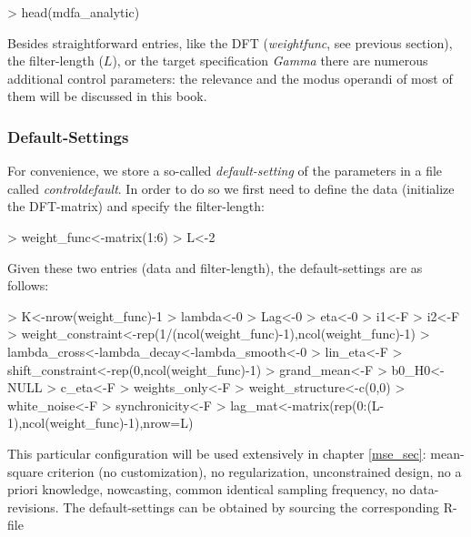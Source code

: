 \documentclass[a4paper]{book}
\begin{document}
\begin{Schunk}
\begin{Sinput}
> head(mdfa_analytic)
\end{Sinput}
\begin{Soutput}
1 function (K, L, lambda, weight_func, Lag, Gamma, eta, cutoff,              
2     i1, i2, weight_constraint, lambda_cross, lambda_decay, lambda_smooth,  
3     lin_eta, shift_constraint, grand_mean, b0_H0, c_eta, weights_only = F, 
4     weight_structure, white_noise, synchronicity, lag_mat)                 
5 {                                                                          
6     weight_target <- weight_func[, 1]                                      
\end{Soutput}
\end{Schunk}
Besides straightforward entries, like the DFT (\emph{weight\textunderscore func}, see previous section), the filter-length ($L$), or the target specification \emph{Gamma} there are numerous additional control parameters: the relevance and the modus operandi of most of them will be discussed in this book. 


\subsubsection{Default-Settings}

For convenience, we store a so-called \emph{default-setting} of the parameters in a file called \emph{control\textunderscore default}. In order to do so we first need to define the data (initialize the DFT-matrix) and specify the filter-length:
\begin{Schunk}
\begin{Sinput}
> weight_func<-matrix(1:6)
> L<-2
\end{Sinput}
\end{Schunk}
Given these two entries (data and filter-length), the default-settings are as follows:
\begin{Schunk}
\begin{Sinput}
> K<-nrow(weight_func)-1
> lambda<-0
> Lag<-0
> eta<-0
> i1<-F
> i2<-F
> weight_constraint<-rep(1/(ncol(weight_func)-1),ncol(weight_func)-1)
> lambda_cross<-lambda_decay<-lambda_smooth<-0
> lin_eta<-F
> shift_constraint<-rep(0,ncol(weight_func)-1)
> grand_mean<-F
> b0_H0<-NULL
> c_eta<-F
> weights_only<-F
> weight_structure<-c(0,0)
> white_noise<-F
> synchronicity<-F
> lag_mat<-matrix(rep(0:(L-1),ncol(weight_func)-1),nrow=L)
\end{Sinput}
\end{Schunk}
This particular configuration will be used extensively in chapter \ref{mse_sec}: mean-square criterion (no customization), no regularization, unconstrained design, no a priori knowledge, nowcasting, common identical sampling frequency, no data-revisions. The default-settings can be obtained by sourcing the corresponding R-file
\end{document}
